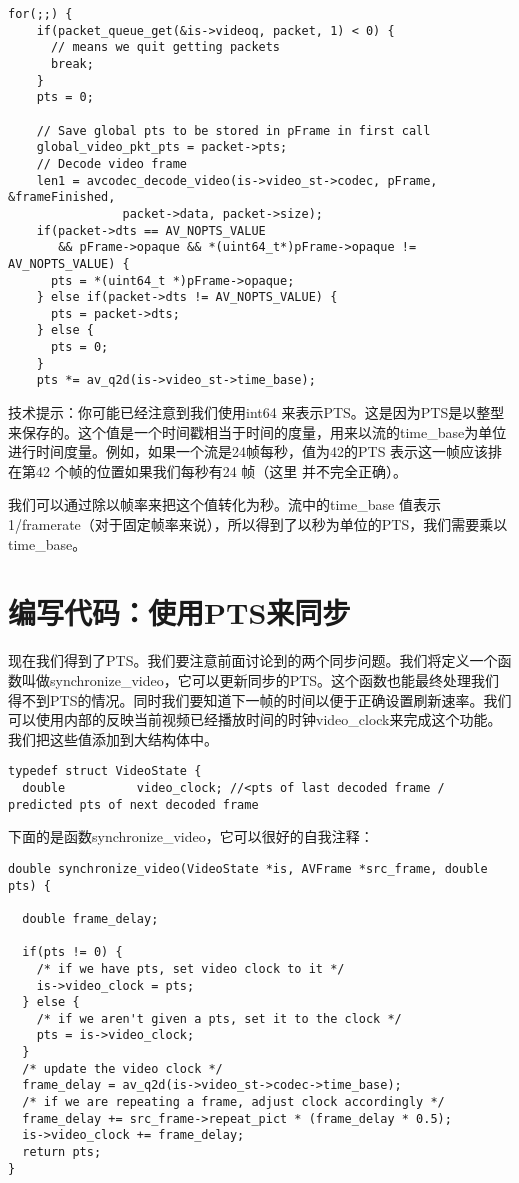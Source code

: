 \begin{lstlisting}
for(;;) {
    if(packet_queue_get(&is->videoq, packet, 1) < 0) {
      // means we quit getting packets
      break;
    }
    pts = 0;

    // Save global pts to be stored in pFrame in first call
    global_video_pkt_pts = packet->pts;
    // Decode video frame
    len1 = avcodec_decode_video(is->video_st->codec, pFrame, &frameFinished,
                packet->data, packet->size);
    if(packet->dts == AV_NOPTS_VALUE
       && pFrame->opaque && *(uint64_t*)pFrame->opaque != AV_NOPTS_VALUE) {
      pts = *(uint64_t *)pFrame->opaque;
    } else if(packet->dts != AV_NOPTS_VALUE) {
      pts = packet->dts;
    } else {
      pts = 0;
    }
    pts *= av_q2d(is->video_st->time_base);
\end{lstlisting}

技术提示：你可能已经注意到我们使用int64 来表示PTS。这是因为PTS是以整型来保存的。这个值是一个时间戳相当于时间的度量，用来以流的time_base为单位进行时间度量。例如，如果一个流是24帧每秒，值为42的PTS 表示这一帧应该排在第42 个帧的位置如果我们每秒有24 帧（这里 并不完全正确）。

我们可以通过除以帧率来把这个值转化为秒。流中的time_base 值表示1/framerate（对于固定帧率来说），所以得到了以秒为单位的PTS，我们需要乘以time_base。

\section{编写代码：使用PTS来同步}

现在我们得到了PTS。我们要注意前面讨论到的两个同步问题。我们将定义一个函数叫做synchronize_video，它可以更新同步的PTS。这个函数也能最终处理我们得不到PTS的情况。同时我们要知道下一帧的时间以便于正确设置刷新速率。我们可以使用内部的反映当前视频已经播放时间的时钟video_clock来完成这个功能。我们把这些值添加到大结构体中。

 \begin{lstlisting}
typedef struct VideoState {
  double          video_clock; //<pts of last decoded frame / predicted pts of next decoded frame
\end{lstlisting}

下面的是函数synchronize_video，它可以很好的自我注释：

\begin{lstlisting}
double synchronize_video(VideoState *is, AVFrame *src_frame, double pts) {

  double frame_delay;

  if(pts != 0) {
    /* if we have pts, set video clock to it */
    is->video_clock = pts;
  } else {
    /* if we aren't given a pts, set it to the clock */
    pts = is->video_clock;
  }
  /* update the video clock */
  frame_delay = av_q2d(is->video_st->codec->time_base);
  /* if we are repeating a frame, adjust clock accordingly */
  frame_delay += src_frame->repeat_pict * (frame_delay * 0.5);
  is->video_clock += frame_delay;
  return pts;
}
\end{lstlisting}

